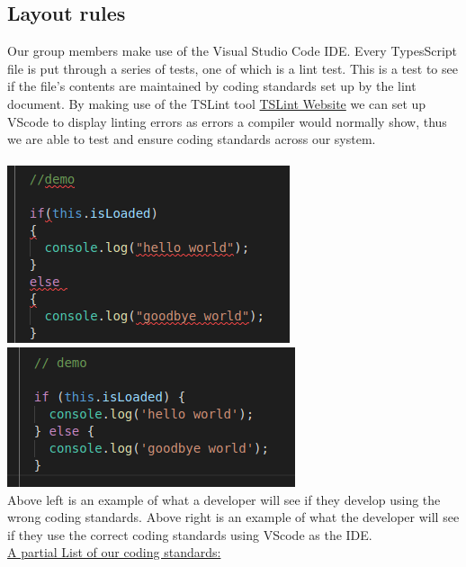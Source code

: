 \documentclass[a4paper]{article}
\begin{document}
\subsection{Layout rules}
Our group members make use of the Visual Studio Code IDE. 
Every TypesScript file is put through a series of tests, one of which is a lint test. This is a test to see if the 
file's contents are maintained by coding standards set up by the lint document. By making use of 
the TSLint tool \href{https://palantir.github.io/tslint/}{TSLint Website} we can set up VScode to display linting 
errors as errors a compiler would normally show, thus we are able to test and ensure coding standards across
our system.\\\\
\includegraphics[scale=0.5]{TSLint_error.png} 
\qquad\qquad\qquad
\includegraphics[scale=0.5]{TSLint_clean.png} \\
Above left is an example of what a developer will see if they develop using the wrong coding standards. 
Above right is an example of what the developer will see if they use the correct coding standards using VScode as the IDE.
\newline\\ 
\underline{A partial List of our coding standards:} 
\end{document}
